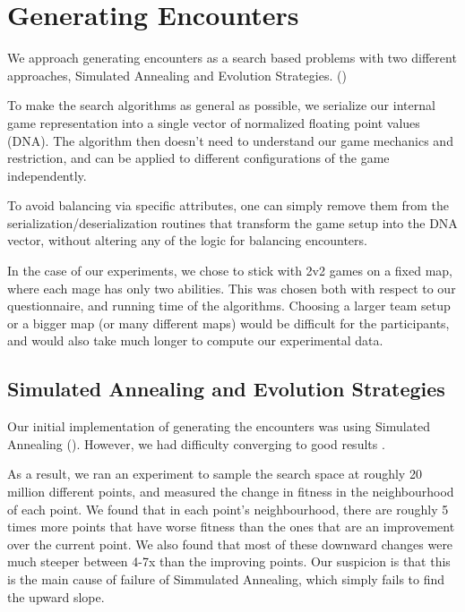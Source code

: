 \chapter{Generating Encounters}

We approach generating encounters as a search based problems with two
different approaches, Simulated Annealing and Evolution Strategies. ()

To make the search algorithms as general as possible, we serialize our
internal game representation into a single vector of normalized floating
point values (DNA). The algorithm then doesn't need to understand our game
mechanics and restriction, and can be applied to different configurations of
the game independently.

To avoid balancing via specific attributes, one can simply remove them from
the serialization/deserialization routines that transform the game setup into
the DNA vector, without altering any of the logic for balancing encounters.

In the case of our experiments, we chose to stick with 2v2 games on a fixed map,
where each mage has only two abilities. This was chosen both with respect to our
questionnaire, and running time of the algorithms. Choosing a larger team setup or
a bigger map (or many different maps) would be difficult for the participants,
and would also take much longer to compute our experimental data.



\section{Simulated Annealing and Evolution Strategies}

Our initial implementation of generating the encounters was using Simulated
Annealing (). However, we had difficulty converging to good
results .

As a result, we ran an experiment to sample the search space at roughly 20
million different points, and measured the change in fitness in the
neighbourhood of each point. We found that in each point's neighbourhood,
there are roughly 5 times more points that have worse fitness than the ones
that are an improvement over the current point. We also found that most of
these downward changes were much steeper between 4-7x than the improving
points. Our suspicion is that this is the main cause of failure of
Simmulated Annealing, which simply fails to find the upward slope.


